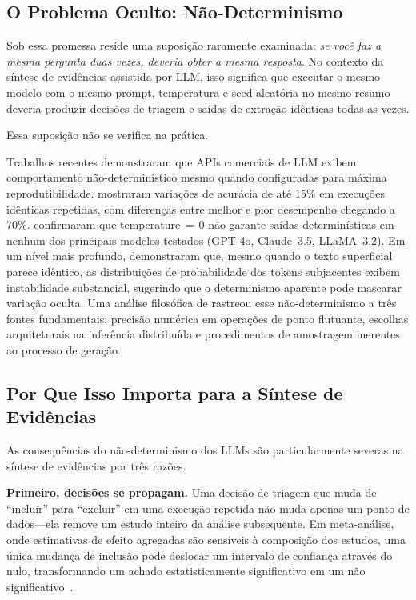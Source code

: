 \documentclass[12pt, a4paper]{article}
\begin{document}
\subsection{O Problema Oculto: Não-Determinismo}

Sob essa promessa reside uma suposição raramente examinada: \emph{se você faz a mesma pergunta duas vezes, deveria obter a mesma resposta}.
No contexto da síntese de evidências assistida por LLM, isso significa que executar o mesmo modelo com o mesmo prompt, temperatura e seed aleatória no mesmo resumo deveria produzir decisões de triagem e saídas de extração idênticas todas as vezes.

Essa suposição não se verifica na prática.

Trabalhos recentes demonstraram que APIs comerciais de LLM exibem comportamento não-determinístico mesmo quando configuradas para máxima reprodutibilidade.
\citet{atil2024nondeterminism} mostraram variações de acurácia de até 15\% em execuções idênticas repetidas, com diferenças entre melhor e pior desempenho chegando a 70\%.
\citet{klishevich2025codereview} confirmaram que temperature$\,{=}\,$0 não garante saídas determinísticas em nenhum dos principais modelos testados (GPT-4o, Claude~3.5, LLaMA~3.2).
Em um nível mais profundo, \citet{fu2026beyond} demonstraram que, mesmo quando o texto superficial parece idêntico, as distribuições de probabilidade dos tokens subjacentes exibem instabilidade substancial, sugerindo que o determinismo aparente pode mascarar variação oculta.
Uma análise filosófica de \citet{karelin2024indeterminism} rastreou esse não-determinismo a três fontes fundamentais: precisão numérica em operações de ponto flutuante, escolhas arquiteturais na inferência distribuída e procedimentos de amostragem inerentes ao processo de geração.

\subsection{Por Que Isso Importa para a Síntese de Evidências}

As consequências do não-determinismo dos LLMs são particularmente severas na síntese de evidências por três razões.

\textbf{Primeiro, decisões se propagam.}
Uma decisão de triagem que muda de ``incluir'' para ``excluir'' em uma execução repetida não muda apenas um ponto de dados---ela remove um estudo inteiro da análise subsequente.
Em meta-análise, onde estimativas de efeito agregadas são sensíveis à composição dos estudos, uma única mudança de inclusão pode deslocar um intervalo de confiança através do nulo, transformando um achado estatisticamente significativo em um não significativo~\citep{rover2026jair}.
\end{document}
